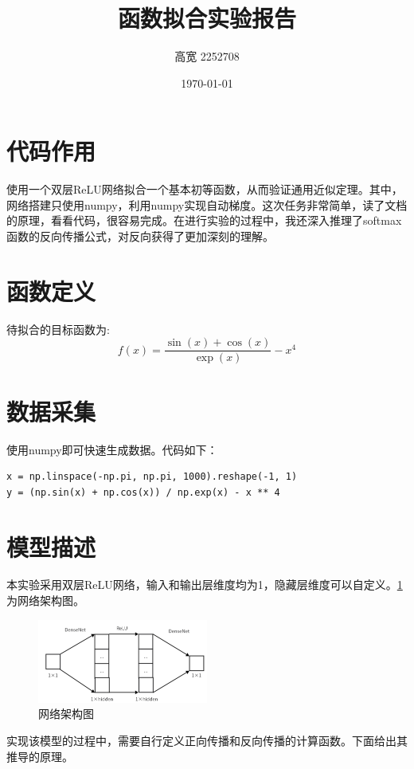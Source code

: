 \documentclass{hopescience}
\title{函数拟合实验报告}
\author{高宽 2252708}
\date{\today}
\begin{document}
\maketitle
\tableofcontents

\vspace{5em}
\section{代码作用}
使用一个双层ReLU网络拟合一个基本初等函数，从而验证通用近似定理。其中，网络搭建只使用numpy，利用numpy实现自动梯度。这次任务非常简单，读了文档的原理，看看代码，很容易完成。在进行实验的过程中，我还深入推理了softmax函数的反向传播公式，对反向获得了更加深刻的理解。

\section{函数定义}
待拟合的目标函数为:
\begin{equation}
    f(x) = \frac{\sin(x) + \cos(x)}{\exp(x)} - x^4
\end{equation}

\section{数据采集}
使用numpy即可快速生成数据。代码如下：
\begin{verbatim}
x = np.linspace(-np.pi, np.pi, 1000).reshape(-1, 1)
y = (np.sin(x) + np.cos(x)) / np.exp(x) - x ** 4
\end{verbatim}

\section{模型描述}
本实验采用双层ReLU网络，输入和输出层维度均为1，隐藏层维度可以自定义。\cref{fig:network}为网络架构图。

\begin{figure}[H]
    \centering
    \includegraphics[width=0.5\textwidth]{images/netarch.png}
    \caption{网络架构图}
    \label{fig:network}
\end{figure}

实现该模型的过程中，需要自行定义正向传播和反向传播的计算函数。下面给出其推导的原理。
\end{document}
